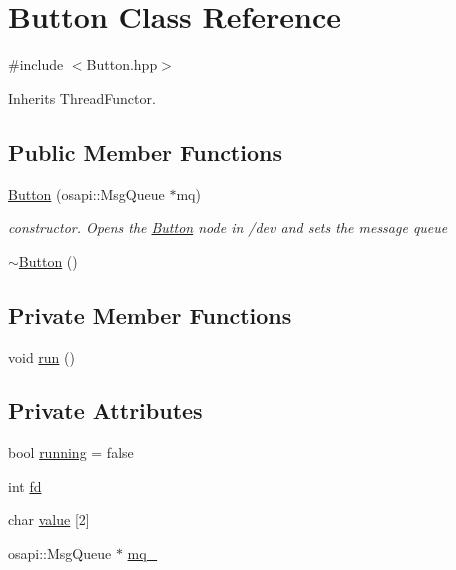 \hypertarget{class_button}{}\section{Button Class Reference}
\label{class_button}


{\ttfamily \#include $<$Button.\+hpp$>$}



Inherits Thread\+Functor.

\subsection*{Public Member Functions}
\begin{DoxyCompactItemize}
\item 
\hyperlink{class_button_ad578f9ff8accb8a05c433da08adc0981}{Button} (osapi\+::\+Msg\+Queue $\ast$mq)
\begin{DoxyCompactList}\small\item\em constructor. Opens the \hyperlink{class_button}{Button} node in /dev and sets the message queue \end{DoxyCompactList}\item 
\hyperlink{class_button_a2a001eb9c3cc8ae54768a850dd345002}{$\sim$\+Button} ()
\end{DoxyCompactItemize}
\subsection*{Private Member Functions}
\begin{DoxyCompactItemize}
\item 
void \hyperlink{class_button_ae5f1226094e45cf814d000dab00593fe}{run} ()
\end{DoxyCompactItemize}
\subsection*{Private Attributes}
\begin{DoxyCompactItemize}
\item 
bool \hyperlink{class_button_a705b1047e838e1a2c6d3a18c51a8c168}{running} = false
\item 
int \hyperlink{class_button_ac044518f4ed7fc329e9d9e7cad6eb146}{fd}
\item 
char \hyperlink{class_button_a81aa56b14de245886c538ca18dfd1782}{value} \mbox{[}2\mbox{]}
\item 
osapi\+::\+Msg\+Queue $\ast$ \hyperlink{class_button_a5e8e98a2391796121a464347d5df5de8}{mq\+\_\+}
\end{DoxyCompactItemize}


